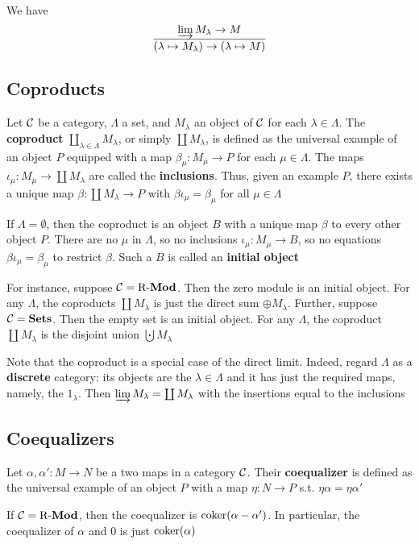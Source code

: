 \documentclass[11pt]{article}
\begin{document}
We have
\begin{equation*}
\frac{\varinjlim M_\lambda\to M}{(\lambda\mapsto M_\lambda)\to(\lambda\mapsto M)}
\end{equation*}
\subsection*{Coproducts \label{6.7}}
\label{sec:org7ebed62}
Let \(\mathcal{C}\) be a category, \(\Lambda\) a set, and \(M_\lambda\) an object of
\(\mathcal{C}\) for each \(\lambda\in\Lambda\). The \textbf{coproduct}
\(\coprod_{\lambda\in\Lambda}M_\lambda\), or simply \(\coprod M_\lambda\), is
defined as the universal example of an object \(P\) equipped with a map
\(\beta_\mu:M_\mu\to P\) for each \(\mu\in\Lambda\). The maps
\(\iota_\mu:M_\mu\to\coprod M_\lambda\) are called the \textbf{inclusions}. Thus,
given an example \(P\), there exists a unique map \(\beta:\coprod M_\lambda\to
   P\) with \(\beta\iota_\mu=\beta_\mu\) for all \(\mu\in\Lambda\)

If \(\Lambda=\emptyset\), then the coproduct is an object \(B\) with a unique
map \(\beta\) to every other object \(P\). There are no \(\mu\) in \(\Lambda\), so no inclusions
\(\iota_\mu:M_\mu\to B\), so no equations \(\beta\iota_\mu=\beta_\mu\) to
restrict \(\beta\). Such a \(B\) is called an \textbf{initial object}

For instance, suppose \(\mathcal{C}=\operatorname{R-\textbf{Mod}}\). Then the zero module is an initial
object. For any \(\Lambda\), the coproducts \(\coprod M_\lambda\) is just the direct
sum \(\oplus M_\lambda\). Further, suppose \(\mathcal{C}=\operatorname{\textbf{Sets}}\). Then the empty
set is an initial object. For any \(\Lambda\), the coproduct \(\coprod M_\lambda\) is
the disjoint union \(\bigcupdot M_\lambda\)

Note that the coproduct is a special case of the direct limit. Indeed, regard
\(\Lambda\) as a \textbf{discrete} category: its objects are the \(\lambda\in\Lambda\) and it
has just the required maps, namely, the \(1_\lambda\). Then \(\varinjlim
   M_\lambda=\coprod M_\lambda\) with the insertions equal to the inclusions
\subsection*{Coequalizers \label{6.8}}
\label{sec:org498ca46}
Let \(\alpha,\alpha':M\to N\) be a two maps in a category \(\mathcal{C}\). Their
\textbf{coequalizer} is defined as the universal example of an object \(P\) with a map
\(\eta:N\to P\) s.t. \(\eta\alpha=\eta\alpha'\)
\begin{center}
\end{center}
If \(\mathcal{C}=\operatorname{R-\textbf{Mod}}\), then the coequalizer is \(\operatorname{coker}(\alpha-\alpha')\). In
particular, the coequalizer of \(\alpha\) and 0 is just \(\operatorname{coker}(\alpha)\)
\end{document}
